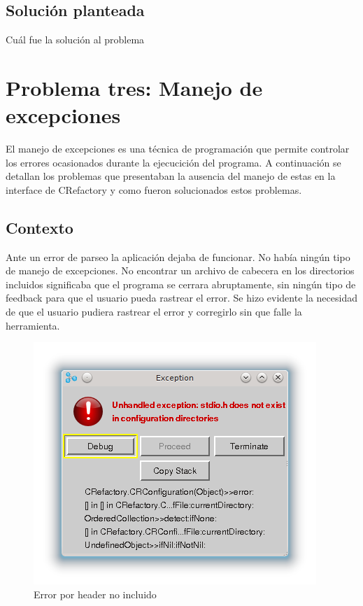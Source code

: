 \documentclass[a4paper,oneside,10pt]{article}
\begin{document}
\subsection{Soluci\'on planteada}
Cu\'al fue la soluci\'on al problema

\section{Problema tres: Manejo de excepciones}

El manejo de excepciones es una t\'ecnica de programaci\'on que permite controlar los errores ocasionados durante la ejecucici\'on del programa.
A continuaci\'on se detallan los problemas que presentaban la ausencia del manejo de estas en la interface de CRefactory y como fueron solucionados estos problemas.

\subsection{Contexto}
Ante un error de parseo la aplicación dejaba de funcionar. No había ningún tipo de manejo de excepciones. No encontrar un archivo de cabecera en los directorios incluidos significaba que el programa se cerrara abruptamente, sin ningún tipo de feedback para que el usuario pueda rastrear el error. Se hizo evidente la necesidad de que el usuario pudiera rastrear el error y corregirlo sin que falle la herramienta.

\begin{figure}[h!]
  \centering
    \includegraphics[scale=0.85]{images/codigo_original/error_header_no_agregado.png}
     \caption{Error por header no incluido}
\end{figure}
\end{document}
